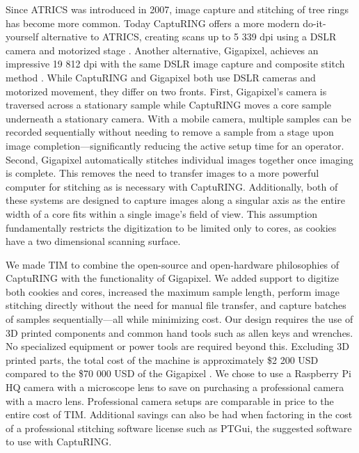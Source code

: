 \documentclass[a4paper,12pt]{article}
\begin{document}
Since ATRICS was introduced in 2007, image capture and stitching of tree rings has become more common. Today CaptuRING offers a more modern do-it-yourself alternative to ATRICS, creating scans up to 5 339 dpi using a DSLR camera and motorized stage \citep{garcia-hidalgo_capturing_2022}. 
Another alternative, Gigapixel, achieves an impressive 19 812 dpi with the same DSLR image capture and composite stitch method \citep{griffin_gigapixel_2021}. 
While CaptuRING and Gigapixel both use DSLR cameras and motorized movement, they differ on two fronts. 
First, Gigapixel's camera is traversed across a stationary sample while CaptuRING moves a core sample underneath a stationary camera.
With a mobile camera, multiple samples can be recorded sequentially without needing to remove a sample from a stage upon image completion---significantly reducing the active setup time for an operator. 
Second, Gigapixel automatically stitches individual images together once imaging is complete. This removes the need to transfer images to a more powerful computer for stitching as is necessary with CaptuRING.
Additionally, both of these systems are designed to capture images along a singular axis as the entire width of a core fits within a single image's field of view.
This assumption fundamentally restricts the digitization to be limited only to cores, as cookies have a two dimensional scanning surface. 

We made TIM to combine the open-source and open-hardware philosophies of CaptuRING with the functionality of Gigapixel.
We added support to digitize both cookies and cores, increased the maximum sample length, perform image stitching directly without the need for manual file transfer, and capture batches of samples sequentially---all while minimizing cost.
Our design requires the use of 3D printed components and common hand tools such as allen keys and wrenches. No specialized equipment or power tools are required beyond this.
Excluding 3D printed parts, the total cost of the machine is approximately \$2 200 USD compared to the \$70 000 USD of the Gigapixel \citep{griffin_gigapixel_2021}.
We chose to use a Raspberry Pi HQ camera with a microscope lens to save on purchasing a professional camera with a macro lens. Professional camera setups are comparable in price to the entire cost of TIM.
Additional savings can also be had when factoring in the cost of a professional stitching software license such as PTGui, the suggested software to use with CaptuRING. 
\end{document}
